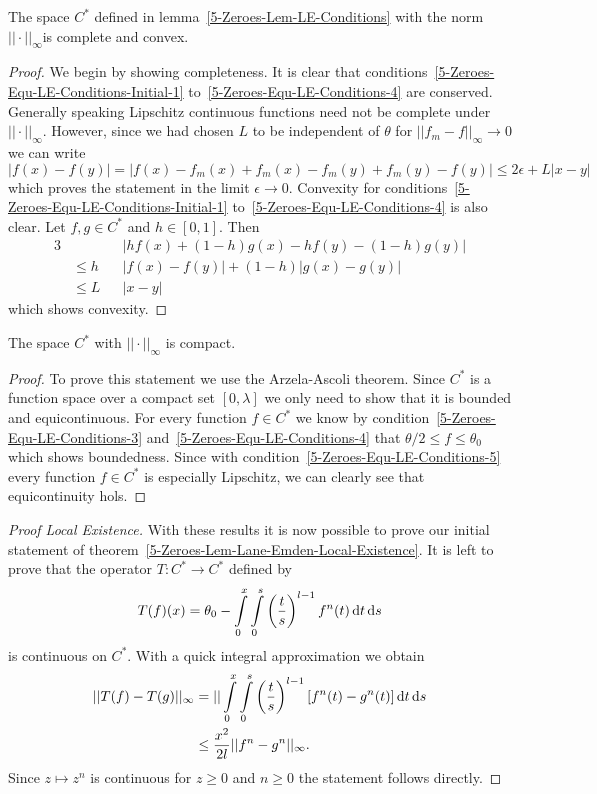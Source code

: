 \begin{lemma}
	The space $C^*$ defined in lemma~\ref{5-Zeroes-Lem-LE-Conditions} with the norm $||\cdot||_\infty$is complete and convex.
\end{lemma}
\begin{proof}
	We begin by showing completeness.
	It is clear that conditions~\eqref{5-Zeroes-Equ-LE-Conditions-Initial-1} to~\eqref{5-Zeroes-Equ-LE-Conditions-4} are conserved.
	Generally speaking Lipschitz continuous functions need not be complete under $||\cdot||_\infty$.
	However, since we had chosen $L$ to be independent of $\theta$ for $||f_m-f||_\infty\rightarrow0$ we can write
	\[
		|f(x)-f(y)|=|f(x)-f_m(x)+f_m(x)-f_m(y)+f_m(y)-f(y)|\leq 2\epsilon+L|x-y|
	\]
	which proves the statement in the limit $\epsilon\rightarrow0$.
	Convexity for conditions~\eqref{5-Zeroes-Equ-LE-Conditions-Initial-1} to~\eqref{5-Zeroes-Equ-LE-Conditions-4} is also clear.
	Let $f,g\in C^*$ and $h\in[0,1]$.
	Then
	\begin{alignat}{3}
		&&&|hf(x)+(1-h)g(x)-hf(y)-(1-h)g(y)|\\
		&\leq h&&|f(x)-f(y)|+ (1-h)|g(x)-g(y)|\\
		&\leq L&&|x-y|
	\end{alignat}
	which shows convexity.
\end{proof}\noindent
\begin{lemma}
	The space $C^*$ with $||\cdot||_\infty$ is compact.
\end{lemma}
\begin{proof}
	To prove this statement we use the Arzela-Ascoli theorem.
	Since $C^*$ is a function space over a compact set $[0,\lambda]$ we only need to show that it is bounded and equicontinuous.
	For every function $f\in C^*$ we know by condition~\eqref{5-Zeroes-Equ-LE-Conditions-3} and~\eqref{5-Zeroes-Equ-LE-Conditions-4} that $\theta/2\leq f\leq\theta_0$ which shows boundedness.
	Since with condition~\eqref{5-Zeroes-Equ-LE-Conditions-5} every function $f\in C^*$ is especially Lipschitz, we can clearly see that equicontinuity hols.
\end{proof}
\begin{proof}[Proof  Local Existence]
	With these results it is now possible to prove our initial statement of theorem~\ref{5-Zeroes-Lem-Lane-Emden-Local-Existence}.
	It is left to prove that the operator $T:C^*\rightarrow C^*$ defined by
	\begin{equation}
		T(f)(x) = \theta_0 - \int\limits_0^x\int\limits_0^s \left(\frac{t}{s}\right)^{l-1}f^n(t)\mathop{}\!\mathrm{d} t\mathop{}\!\mathrm{d} s
		\label{eq:5-Zeroes-LE-Definition-Operator-On-C-Star}
	\end{equation}
	is continuous on $C^*$.
	With a quick integral approximation we obtain
	\begin{align}
		||T(f)-T(g)||_{\infty} &= ||\int\limits_0^x\int\limits_0^s \left(\frac{t}{s}\right)^{l-1}\left[f^n(t)-g^n(t)\right]\mathop{}\!\mathrm{d} t\mathop{}\!\mathrm{d} s\\
		&\leq \frac{x^2}{2l}||f^n-g^n||_{\infty}.
	\end{align}
	Since $z\mapsto z^n$ is continuous for $z\geq0$ and $n\geq0$ the statement follows directly.
\end{proof}\noindent
